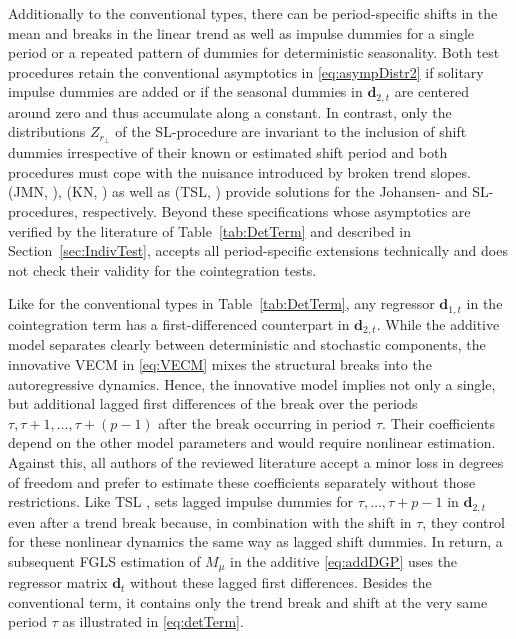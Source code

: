 Additionally to the conventional types, there can be period-specific shifts in the mean and breaks in the linear trend as well as impulse dummies for a single period or a repeated pattern of dummies for deterministic seasonality. Both test procedures retain the conventional asymptotics in \eqref{eq:asympDistr2} if solitary impulse dummies are added or if the seasonal dummies in $ \boldsymbol{d}_{2,t} $ are centered around zero and thus accumulate along a constant. In contrast, only the distributions $ Z_{r_\perp} $ of the SL-procedure are invariant to the inclusion of shift dummies irrespective of their known or estimated shift period and both procedures must cope with the nuisance introduced by broken trend slopes. \citeauthor*{JohansenEtAl2000} (JMN, \citeyear{JohansenEtAl2000}), \citeauthor*{KuritaNielsen2019} (KN, \citeyear{KuritaNielsen2019}) as well as \citeauthor*{TrenklerEtAl2008} (TSL, \citeyear{TrenklerEtAl2008}) provide solutions for the Johansen- and SL-procedures, respectively. Beyond these specifications whose asymptotics are verified by the literature of Table~\ref{tab:DetTerm} and described in Section~\ref{sec:IndivTest},  accepts all period-specific extensions technically and does not check their validity for the cointegration tests.

Like for the conventional types in Table~\ref{tab:DetTerm}, any regressor $ \boldsymbol{d}_{1,t} $ in the cointegration term has a first-differenced counterpart in $ \boldsymbol{d}_{2,t} $. While the additive model separates clearly between deterministic and stochastic components, the innovative VECM in \eqref{eq:VECM} mixes the structural breaks into the autoregressive dynamics. Hence, the innovative model implies not only a single, but additional lagged first differences of the break over the periods $ \tau, \tau+1, \ldots, \tau+(p-1) $ after the break occurring in period $ \tau $. Their coefficients depend on the other model parameters and would require nonlinear estimation. Against this, all authors of the reviewed literature accept a minor loss in degrees of freedom and prefer to estimate these coefficients separately without those restrictions. Like TSL \citeyearpar[p.~335]{TrenklerEtAl2008},  sets lagged impulse dummies for $ \tau, \ldots, \tau+p-1 $ in $ \boldsymbol{d}_{2,t} $ even after a trend break because, in combination with the shift in $ \tau $, they control for these nonlinear dynamics the same way as lagged shift dummies. In return, a subsequent FGLS estimation of $ M_\mu $ in the additive \eqref{eq:addDGP} uses the regressor matrix $ \boldsymbol{d}_t $ without these lagged first differences. Besides the conventional term, it contains only the trend break and shift at the very same period $ \tau $ as illustrated in \eqref{eq:detTerm}.


